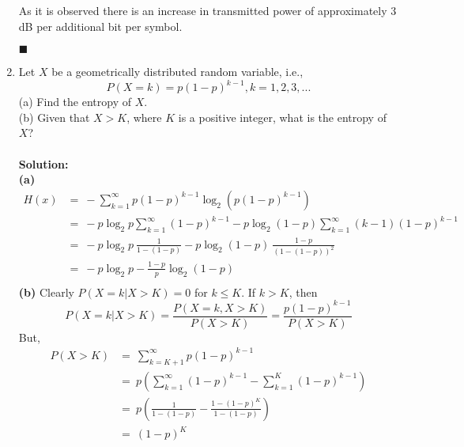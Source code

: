 \documentclass[a4paper,12pt]{article}
\begin{document}
\begin{enumerate}
\begin{center}
\begin{tabular}{ | c || c | c | c |}
                 \hline
                \end{tabular}
            \end{center}
            As it is observed there is an increase in transmitted power of approximately 3 dB per additional bit per symbol.
            \begin{flushright}
                $\blacksquare$
            \end{flushright}
        \item
            Let $X$ be a geometrically distributed random variable, i.e., $$P(X = k) = p(1-p)^{k - 1}, k = 1, 2, 3, ...$$
            (a) Find the entropy of $X$. \\ 
            (b) Given that $X > K$, where $K$ is a positive integer, what is the entropy of $X$? \\ \\ 
            \textbf{Solution:} \\
            \textbf{(a)} 
            \begin{align*}
                H(x) &= \ - \sum_{k = 1}^{\infty} p \left(1 - p\right)^{k - 1} \log_2 \left(p\left(1 - p\right)^{k - 1}\right) \\
                     &= \ -p \log_2 p \sum_{k = 1}^{\infty} \left(1 - p\right)^{k - 1} - p \log_2 (1 - p) \sum_{k = 1}^{\infty} (k - 1)\left(1 - p\right)^{k - 1} \\
                     &= \ -p \log_2 p \ \frac{1}{1 - \left(1 - p\right)} - p \log_2 (1 - p) \ \frac{1 - p}{\left( 1 - \left(1 - p\right) \right)^2} \\ 
                     &= \ -p \log_2 p - \frac{1 - p}{p} \log_2 (1 - p) \\ 
            \end{align*}
            \textbf{(b)} 
            Clearly $P(X = k | X > K) = 0$ for $k \leq K$. If $k > K$, then $$P(X = k | X > K) = \frac{P(X = k, X > K)}{P(X > K)} = \frac{p(1 - p)^{k - 1}}{P(X > K)}$$ But, 
            \begin{align*}
                P(X > K) &= \ \sum_{k = K + 1}^{\infty} p \left(1 - p\right)^{k - 1} \\
                         &= \ p \left( \sum_{k = 1}^{\infty} \left(1 - p\right)^{k - 1} - \sum_{k = 1}^{K} \left(1 - p\right)^{k - 1} \right) \\
                         &= \ p \left( \frac{1}{1 - (1 - p)} - \frac{1 - (1 - p)^K}{1 - (1 - p)} \right) \\ 
                         &= \ (1 - p)^K \\ 

\end{align*}
\end{enumerate}
\end{document}
